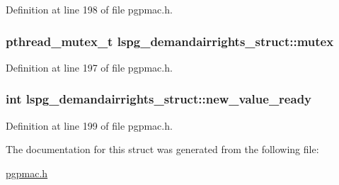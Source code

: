 Definition at line 198 of file pgpmac.\-h.

\hypertarget{structlspg__demandairrights__struct_a874970af767d4bb329f9764075b30096}{
\subsubsection[{mutex}]{\setlength{\rightskip}{0pt plus 5cm}pthread\-\_\-mutex\-\_\-t lspg\-\_\-demandairrights\-\_\-struct\-::mutex}}\label{structlspg__demandairrights__struct_a874970af767d4bb329f9764075b30096}


Definition at line 197 of file pgpmac.\-h.

\hypertarget{structlspg__demandairrights__struct_ad686c9a04d0c7e10b236c234eaf03ce7}{
\subsubsection[{new\-\_\-value\-\_\-ready}]{\setlength{\rightskip}{0pt plus 5cm}int lspg\-\_\-demandairrights\-\_\-struct\-::new\-\_\-value\-\_\-ready}}\label{structlspg__demandairrights__struct_ad686c9a04d0c7e10b236c234eaf03ce7}


Definition at line 199 of file pgpmac.\-h.



The documentation for this struct was generated from the following file\-:\begin{DoxyCompactItemize}
\item 
\hyperlink{pgpmac_8h}{pgpmac.\-h}\end{DoxyCompactItemize}
